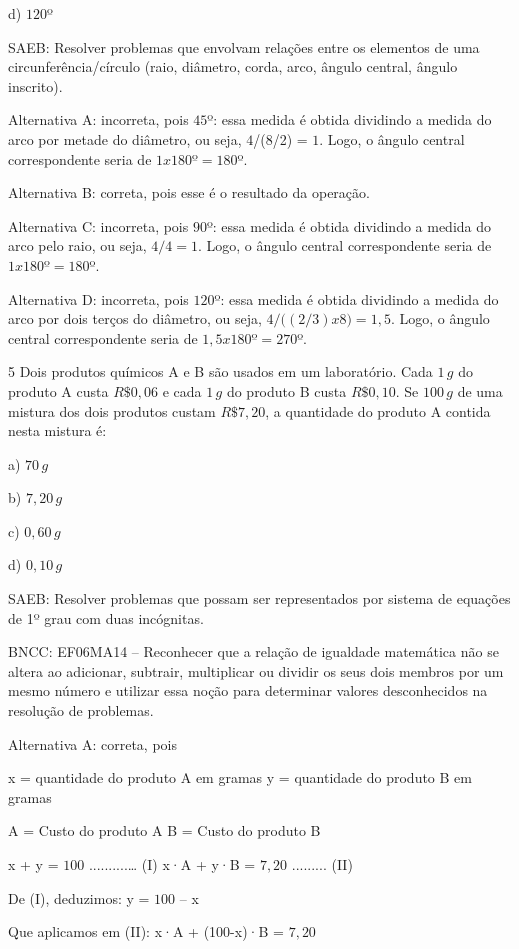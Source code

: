 d) $120$º

SAEB: Resolver problemas que envolvam relações entre os elementos de uma
circunferência/círculo (raio, diâmetro, corda, arco, ângulo central,
ângulo inscrito).

Alternativa A: incorreta, pois $45$º: essa medida é obtida dividindo a
medida do arco por metade do diâmetro, ou seja, $4$/(8/2) = $1$. Logo, o
ângulo central correspondente seria de $1 x 180º = 180$º.

Alternativa B: correta, pois esse é o resultado da operação.

Alternativa C: incorreta, pois $90$º: essa medida é obtida dividindo a
medida do arco pelo raio, ou seja, $4/4 = 1$. Logo, o ângulo central
correspondente seria de $1 x 180º = 180$º.

Alternativa D: incorreta, pois $120$º: essa medida é obtida dividindo a
medida do arco por dois terços do diâmetro, ou seja, $4/((2/3) x $8$) =
1,5$. Logo, o ângulo central correspondente seria de $1,5 x 180º = 270$º.

\num{5}  Dois produtos químicos A e B são usados em um laboratório. Cada $1\,g$ do
produto A custa $R\$0,06$ e cada $1\,g$ do produto B custa
$R\$0,10$. Se $100\,g$ de uma mistura dos dois produtos custam $R\$7,20$, a
quantidade do produto A contida nesta mistura é:

a) $70\,g$

b) $7,20\,g$

c) $0,60\,g$

d) $0,10\,g$

SAEB: Resolver problemas que possam ser representados por sistema de
equações de 1º grau com duas incógnitas.

BNCC: EF06MA14 -- Reconhecer que a relação de igualdade matemática não
se altera ao adicionar, subtrair, multiplicar ou dividir os seus dois
membros por um mesmo número e utilizar essa noção para determinar
valores desconhecidos na resolução de problemas.

Alternativa A: correta, pois

x = quantidade do produto A em gramas y = quantidade do produto B em
gramas

A = Custo do produto A B = Custo do produto B

x + y = $100$ ..........\ldots{} (I) x·A + y·B = $7,20$ ......... (II)

De (I), deduzimos: y = $100$ -- x

Que aplicamos em (II): x·A + (100-x)·B = $7,20$

